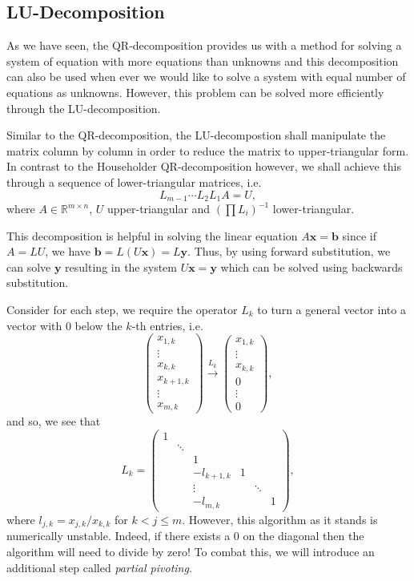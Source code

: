 \documentclass[
]{article}
\theoremstyle{definition}
\theoremstyle{definition}
\begin{document}
\hypertarget{lu-decomposition}{%
\subsection{LU-Decomposition}\label{lu-decomposition}}

As we have seen, the QR-decomposition provides us with a method for
solving a system of equation with more equations than unknowns and this
decomposition can also be used when ever we would like to solve a system
with equal number of equations as unknowns. However, this problem can be
solved more efficiently through the LU-decomposition.

Similar to the QR-decomposition, the LU-decompostion shall manipulate
the matrix column by column in order to reduce the matrix to
upper-triangular form. In contrast to the Householder QR-decomposition
however, we shall achieve this through a sequence of lower-triangular
matrices, i.e.~ \[L_{m - 1} \cdots L_2 L_1 A = U,\] where
\(A \in \mathbb{R}^{m \times n}\), \(U\) upper-triangular and
\((\prod L_i)^{-1}\) lower-triangular.

This decomposition is helpful in solving the linear equation
\(A\mathbf{x} = \mathbf{b}\) since if \(A = LU\), we have
\(\mathbf{b} = L (U\mathbf{x}) = L\mathbf{y}\). Thus, by using forward
substitution, we can solve \(\mathbf{y}\) resulting in the system
\(U\mathbf{x} = \mathbf{y}\) which can be solved using backwards
substitution.

Consider for each step, we require the operator \(L_k\) to turn a
general vector into a vector with 0 below the \(k\)-th entries, i.e.
\[\begin{pmatrix}
  x_{1, k} \\ \vdots \\ x_{k, k} \\ x_{k + 1, k} \\ \vdots \\ x_{m, k}
  \end{pmatrix} 
  \xrightarrow[]{L_k} 
  \begin{pmatrix}
  x_{1, k} \\ \vdots \\ x_{k, k} \\ 0 \\ \vdots \\ 0
  \end{pmatrix},\] and so, we see that \[L_k = 
\begin{pmatrix}
  1 & & & & & \\
  & \ddots & & & & \\
  & & 1 & & & \\
  & & -l_{k + 1, k} & 1 & & \\
  & & \vdots & & \ddots & \\
  & & -l_{m, k} & & & 1
\end{pmatrix},\] where \(l_{j, k} = x_{j, k} / x_{k, k}\) for
\(k < j \le m\). However, this algorithm as it stands is numerically
unstable. Indeed, if there exists a \(0\) on the diagonal then the
algorithm will need to divide by zero! To combat this, we will introduce
an additional step called \emph{partial pivoting}.
\end{document}
